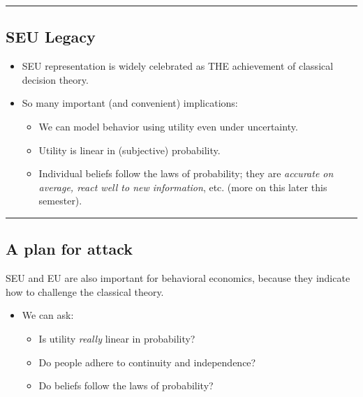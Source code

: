 \documentclass[
  letterpaper,
  DIV=11,
  numbers=noendperiod]{scrartcl}
\providecommand{\tightlist}{%
  \setlength{\itemsep}{0pt}\setlength{\parskip}{0pt}}\usepackage{longtable,booktabs,array}
\begin{document}
\begin{center}\rule{0.5\linewidth}{0.5pt}\end{center}

\subsection{SEU Legacy}\label{seu-legacy}

\begin{itemize}
\tightlist
\item
  SEU representation is widely celebrated as THE achievement of
  classical decision theory.
\item
  So many important (and convenient) implications:

  \begin{itemize}
  \tightlist
  \item
    We can model behavior using utility even under uncertainty.
  \item
    Utility is linear in (subjective) probability.
  \item
    Individual beliefs follow the laws of probability; they are
    \emph{accurate on average, react well to new information}, etc.
    (more on this later this semester).
  \end{itemize}
\end{itemize}

\begin{center}\rule{0.5\linewidth}{0.5pt}\end{center}

\subsection{A plan for attack}\label{a-plan-for-attack}

SEU and EU are also important for behavioral economics, because they
indicate how to challenge the classical theory.

\begin{itemize}
\tightlist
\item
  We can ask:

  \begin{itemize}
  \tightlist
  \item
    Is utility \emph{really} linear in probability?
  \item
    Do people adhere to continuity and independence?
  \item
    Do beliefs follow the laws of probability?
  \end{itemize}
\end{itemize}
\end{document}
